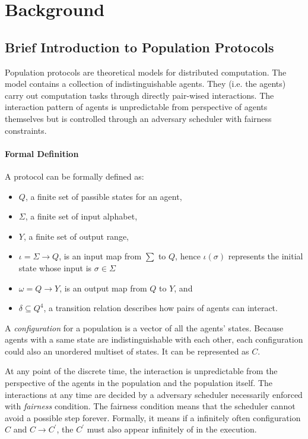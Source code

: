 \section{Background}
\subsection{Brief Introduction to Population Protocols \cite{AspnesR2007, MCS11}}
\par\noindent
Population protocols are theoretical models for distributed computation.
The model contains a collection of indistinguishable agents.
They (i.e. the agents) carry out computation tasks through directly pair-wised interactions.
The interaction pattern of agents is unpredictable from perspective of agents themselves
but is controlled through an adversary scheduler with fairness constraints.
\paragraph{Formal Definition}
A protocol can be formally defined as:
\begin{itemize}
  \item $Q$, a finite set of passible states for an agent,
  \item $\Sigma$, a finite set of input alphabet,
  \item $Y$, a finite set of output range,
  \item $\iota = \Sigma \to Q $, is an input map from $\sum$ to $Q$, hence $\iota(\sigma)$ represents the initial state whose input is $\sigma \in \Sigma$
  \item $\omega = Q \to Y $, is an output map from $Q$ to $Y$, and
  \item $\delta \subseteq Q^{4}$, a transition relation describes how pairs of agents can interact.
\end{itemize}

\par\noindent
A \textit{configuration} for a population is a vector of all the agents' states.
Because agents with a same state are indistinguishable with each other, each configuration
could also an unordered multiset of states. It can be represented as $C$.


\par \label{IntroToPPFairScheduler} \noindent
At any point of the discrete time, the interaction is unpredictable from the perspective of the agents
in the population and the population itself. The interactions at any time are decided
by a adversary scheduler necessarily enforced with \textit{fairness} condition.
The fairness condition means that the scheduler cannot avoid a possible step forever.
Formally, it means if a infinitely often configuration $C$ and $C \to C^{'}$,
the $C^{'}$ must also appear infinitely of in the execution.


